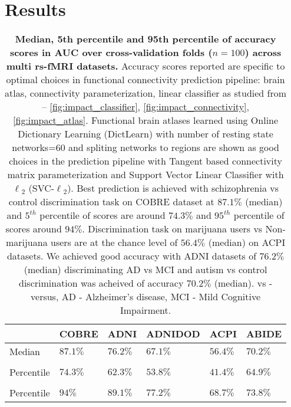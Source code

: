 \documentclass[5p]{elsarticle}
\begin{document}
\section{Results}

\begin{table}[tb]
\small
\begin{tabularx}{\linewidth}{p{1.2cm}|p{1.0cm}|p{0.7cm}|p{1.42cm}|l|l}
    \rowcolor{gray!50}
    \centering{Accuracy} & COBRE & ADNI & ADNIDOD & ACPI & ABIDE \\
    \hline
    \rowcolor{gray!13}
    Median& $87.1\%$ & $76.2\%$ & $67.1\%$ & $56.4\%$ & $70.2\%$\\
    {\centering $5^{th}$ \\ Percentile} & $74.3\%$ & $62.3\%$ &
    $53.8\%$ & $41.4\%$ & $64.9\%$\\[.1ex]
    \rowcolor{gray!13}
    {\centering $95^{th}$ \\ Percentile} & $94\%$ & $89.1\%$ &
    $77.2\%$ & $68.7\%$ & $73.8\%$\\
    \hline
\end{tabularx}
    \caption{\textbf{
            Median, 5th percentile and 95th percentile of accuracy scores in AUC
            over cross-validation folds ($n=100$) across multi rs-fMRI datasets.}
            Accuracy scores reported are specific to optimal choices in
            functional connectivity prediction pipeline: brain atlas,
            connectivity parameterization, linear classifier as studied
            from -- \autoref{fig:impact_classifier},
            \autoref{fig:impact_connectivity}, \autoref{fig:impact_atlas}.
            Functional brain atlases
            learned using Online Dictionary Learning (DictLearn) with
            number of resting state networks=$60$ and spliting networks to regions are
            shown as good choices in the prediction pipeline with Tangent based
            connectivity matrix parameterization and Support Vector Linear
            Classifier with $\ell{_2}$ (SVC-$\ell{_2}$).
            Best prediction is achieved with schizophrenia vs control
            discrimination task on COBRE dataset at $87.1\%$ (median) and
            $5^{th}$ percentile of scores are around $74.3\%$ and $95^{th}$
            percentile of scores around $94\%$. Discrimination task on marijuana
            users vs Non-marijuana users are at the chance level of $56.4\%$
            (median) on ACPI
            datasets. We achieved good accuracy with ADNI datasets of $76.2\%$
            (median) discriminating AD vs MCI and autism vs control
            discrimination was acheived of accuracy $70.2\%$ (median).
            vs - versus, AD - Alzheimer's disease, MCI - Mild Cognitive
            Impairment.}
    \label{tab:scores}
\end{table}
\end{document}
